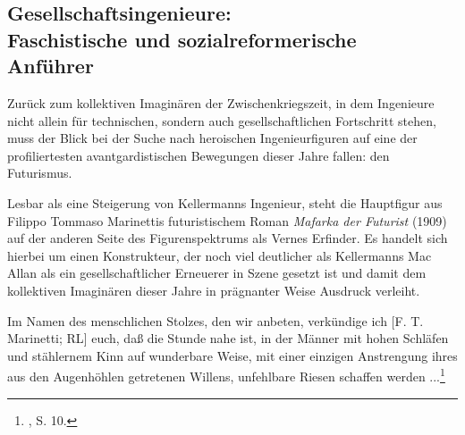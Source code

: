 \documentclass[%
	fontsize=10pt,%
	twoside,%
	headings=optiontoheadandtoc,%
	showtrims]{scrbook}
\renewenvironment{quote}{%
  \addmargin[\genericindent]{0pt}%
  \KOMAoptions{parskip=true}%
  \ifdim\parskip>0pt\else\addvspace{\intextsep}\fi
}{%
  \par
  \endaddmargin\vspace{\intextsep}
}
\begin{document}
\subsection[Gesellschaftsingenieure:    Faschistische und sozial\-reformerische    Anführer]{Gesellschaftsingenieure: \- \protect\\ Faschistische und sozial\-reformerische \- \protect\\ Anführer}
\par Zurück zum kollektiven Imaginären der Zwischenkriegszeit, in dem Ingenieure nicht allein für technischen, sondern auch gesellschaftlichen Fortschritt stehen, muss der Blick bei der Suche nach heroischen Ingenieurfiguren auf eine der profiliertesten avantgardistischen Bewegungen dieser Jahre fallen: den Futurismus.\par Lesbar als eine Steigerung von Kellermanns Ingenieur, steht die Hauptfigur aus Filippo Tommaso Marinettis futuristischem Roman \emph{Mafarka der Futurist} (1909) auf der anderen Seite des Figurenspektrums als Vernes Erfinder. Es handelt sich hierbei um einen Konstrukteur, der noch viel deutlicher als Kellermanns Mac Allan als ein gesellschaftlicher Erneuerer in Szene gesetzt ist und damit dem kollektiven Imaginären dieser Jahre in prägnanter Weise Ausdruck verleiht.\begin{quote}
\par Im Namen des menschlichen Stolzes, den wir anbeten, verkündige ich {[}F. T. Marinetti; RL{]} euch, daß die Stunde nahe ist, in der Männer mit hohen Schläfen und stählernem Kinn auf wunderbare Weise, mit einer einzigen Anstrengung ihres aus den Augenhöhlen getretenen Willens, unfehlbare Riesen schaffen werden ...\footnote{\cite[][]{marinetti2004a}, S. 10.} 
\end{quote}
\end{document}
